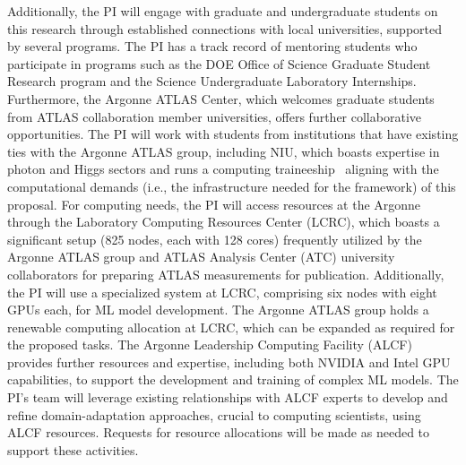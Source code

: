 \documentclass[letter, USenglish, 11pt, subfigure]{article}
\begin{document}
Additionally, the PI will engage with graduate and undergraduate students on this research through established connections with local universities, supported by several programs. The PI has a track record of mentoring students who participate in programs such as the DOE Office of Science Graduate Student Research program and the Science Undergraduate Laboratory Internships. Furthermore, the Argonne ATLAS Center, which welcomes graduate students from ATLAS collaboration member universities, offers further collaborative opportunities. The PI will work with students from institutions that have existing ties with the Argonne ATLAS group, including NIU, which boasts expertise in photon and Higgs sectors and runs a computing traineeship~\cite{C2THEP2} aligning with the computational demands (i.e., the infrastructure needed for the framework) of this proposal.
For computing needs, the PI will access resources at the Argonne through the Laboratory Computing Resources Center (LCRC), which boasts a significant setup (825 nodes, each with 128 cores) frequently utilized by the Argonne ATLAS group and ATLAS Analysis Center (ATC) university collaborators for preparing ATLAS measurements for publication. Additionally, the PI will use a specialized system at LCRC, comprising six nodes with eight GPUs each, for ML model development. The Argonne ATLAS group holds a renewable computing allocation at LCRC, which can be expanded as required for the proposed tasks. The Argonne Leadership Computing Facility (ALCF) provides further resources and expertise, including both NVIDIA and Intel GPU capabilities, to support the development and training of complex ML models. The PI's team will leverage existing relationships with ALCF experts to develop and refine domain-adaptation approaches, crucial to computing scientists, using ALCF resources. Requests for resource allocations will be made as needed to support these activities.
\end{document}
